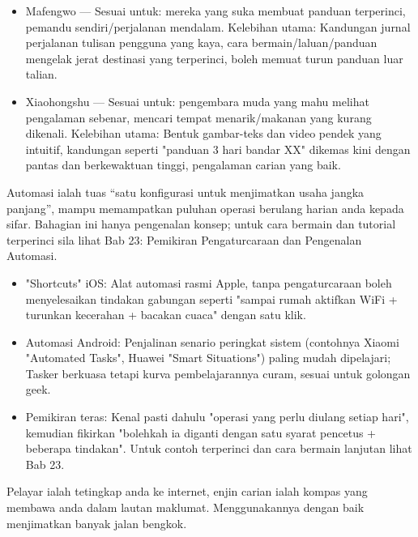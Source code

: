 
\begin{itemize}
  \item Mafengwo — Sesuai untuk: mereka yang suka membuat panduan terperinci, pemandu sendiri/perjalanan mendalam. Kelebihan utama: Kandungan jurnal perjalanan tulisan pengguna yang kaya, cara bermain/laluan/panduan mengelak jerat destinasi yang terperinci, boleh memuat turun panduan luar talian.
  \item Xiaohongshu — Sesuai untuk: pengembara muda yang mahu melihat pengalaman sebenar, mencari tempat menarik/makanan yang kurang dikenali. Kelebihan utama: Bentuk gambar-teks dan video pendek yang intuitif, kandungan seperti "panduan 3 hari bandar XX" dikemas kini dengan pantas dan berkewaktuan tinggi, pengalaman carian yang baik.
\end{itemize}


Automasi ialah tuas “satu konfigurasi untuk menjimatkan usaha jangka panjang”, mampu memampatkan puluhan operasi berulang harian anda kepada sifar. Bahagian ini hanya pengenalan konsep; untuk cara bermain dan tutorial terperinci sila lihat Bab 23: Pemikiran Pengaturcaraan dan Pengenalan Automasi.

\begin{itemize}
  \item "Shortcuts" iOS: Alat automasi rasmi Apple, tanpa pengaturcaraan boleh menyelesaikan tindakan gabungan seperti "sampai rumah aktifkan WiFi + turunkan kecerahan + bacakan cuaca" dengan satu klik.
  \item Automasi Android: Penjalinan senario peringkat sistem (contohnya Xiaomi "Automated Tasks", Huawei "Smart Situations") paling mudah dipelajari; Tasker berkuasa tetapi kurva pembelajarannya curam, sesuai untuk golongan geek.
  \item Pemikiran teras: Kenal pasti dahulu "operasi yang perlu diulang setiap hari", kemudian fikirkan "bolehkah ia diganti dengan satu syarat pencetus + beberapa tindakan". Untuk contoh terperinci dan cara bermain lanjutan lihat Bab 23.
\end{itemize}


Pelayar ialah tetingkap anda ke internet, enjin carian ialah kompas yang membawa anda dalam lautan maklumat. Menggunakannya dengan baik menjimatkan banyak jalan bengkok.

